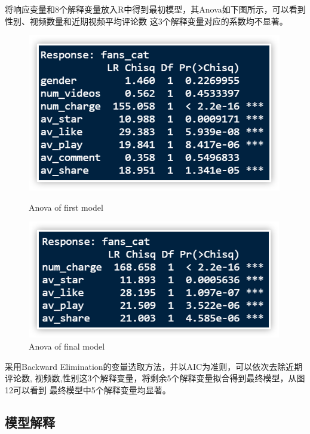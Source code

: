 \documentclass{ctexart}
\begin{document}
将响应变量和8个解释变量放入R中得到最初模型，其Anova如下图所示，可以看到性别、视频数量和近期视频平均评论数
这3个解释变量对应的系数均不显著。
\begin{figure}[H]
    \centering
    \begin{minipage}[t]{0.48\textwidth}
        \centering
        \includegraphics[width=\textwidth]{MLR/Anova1.png}
        \caption{Anova of first model}
    \end{minipage}
    \begin{minipage}[t]{0.48\textwidth}
        \centering
        \includegraphics[width=\textwidth]{MLR/Anova2.png}
        \caption{Anova of final model}
    \end{minipage}
\end{figure}


采用Backward Elimination的变量选取方法，并以AIC为准则，可以依次去除近期评论数,
视频数,性别这3个解释变量，将剩余5个解释变量拟合得到最终模型，从图12可以看到
最终模型中5个解释变量均显著。

\subsection{模型解释}
\end{document}
